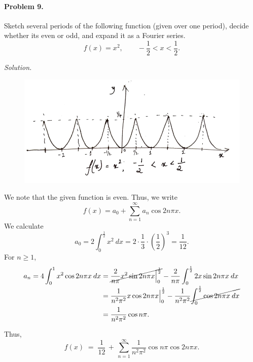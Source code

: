 \documentclass[10pt]{article}
\begin{document}
        \paragraph{Problem 9.} Sketch several periods of the following function (given over one period), decide whether its even or odd, and expand it
        as a Fourier series.
        \[
                f(x) = x^2, \qquad -\frac{1}{2} < x < \frac{1}{2}.
        \]

        \textit{Solution.}
        \begin{figure}[H]
                \centering        
                \includegraphics[scale=0.5]{./7_9.png}
        \end{figure}
        We note that the given function is even. Thus, we write
        \[
                f(x) = a_0 + \sum_{n = 1}^\infty a_n \cos{2n\pi x}.
        \]
        We calculate
        \[
                a_0 = 2\int_{0}^{\frac{1}{2}} x^2\:dx = 2\cdot \frac{1}{3}\cdot \left(\frac{1}{2}\right)^3 = \frac{1}{12}.
        \]
        For $n \geq 1$,
        \begin{align*}
                a_n = 4\int_0^1 x^2\cos{2n\pi x}\:dx 
                        &= \cancel{\frac{2}{n\pi}x^2\sin{2n\pi x}\Big|_0^{\frac{1}{2}}} - \frac{2}{n\pi}\int_0^\frac{1}{2} 2x\sin{2n\pi x}\:dx \\
                        &= \frac{1}{n^2\pi^2}x\cos{2n\pi x}\Big|_0^{\frac{1}{2}} - \frac{1}{n^2\pi^2}\cancel{\int_0^\frac{1}{2} \cos{2n\pi x}\:dx} \\
                        &= \frac{1}{n^2\pi^2}\cos{n\pi}.
        \end{align*}

        Thus,
        \[
                f(x) \;=\; \frac{1}{12} \,+\, \sum_{n = 1}^\infty \frac{1}{n^2\pi^2}\cos{n\pi}\cos{2n\pi x}.
        \]
\end{document}
